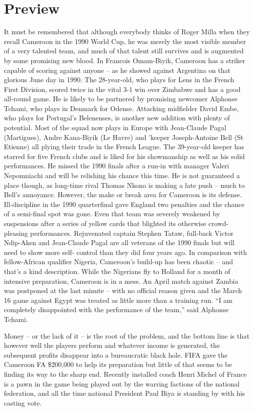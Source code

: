 \section{Preview}
It must be remembered that although everybody thinks of Roger Milla when they 
recall Cameroon in the 1990 World Cup, he was merely the most visible member of 
a very talented team, and much of that talent still survives and is augmented 
by some promising new blood.
In Francois Omam-Biyik, Cameroon has a striker capable of scoring against
anyone -- as he showed against Argentina on that glorious June day in 1990.
The 28-year-old, who plays for Lens in the French First Division, scored twice 
in the vital 3-1 win over Zimbabwe and has a good all-round game. He is likely 
to be partnered by promising newcomer Alphonse Tchami, who plays in Denmark for
Odense. Attacking midfielder David Embe, who plays for Portugal's Belenenses, 
is another new addition with plenty of potential. Most of the squad now plays 
in Europe with Jean-Claude Pagal (Martigues), Andre Kana-Biyik (Le Havre) and 
'keeper Joseph-Antoine Bell (St Etienne) all plying their trade in the French 
League. The 39-year-old keeper has starred for five French clubs and is liked 
for his showmanship as well as his solid performances. He missed the 1990 
finals after a run-in with manager Valeri Nepomniachi and will be relishing 
his chance this time. He is not guaranteed a place though, as long-time rival 
Thomas Nkono is making a late push -- much to Bell's annoyance. However, the
make or break area for Cameroon is its defense. Ill-discipline in the 1990 
quarterfinal gave England two penalties and the chance of a semi-final spot was
gone. Even that team was severely weakened by suspensions after a series of 
yellow cards that blighted its otherwise crowd-pleasing performances.
Rejuvenated captain Stephen Tataw, full-back Victor Ndip-Aken and Jean-Claude
Pagal are all veterans of the 1990 finals but will need to show more self-
control than they did four years ago. In comparison with fellow-African 
qualifier Nigeria, Cameroon's build-up has been chaotic -- and that's a kind 
description. While the Nigerians fly to Holland for a month of intensive 
preparation, Cameroon is in a mess. An April match against Zambia was postponed 
at the last minute -- with no official reason given and the March 16 game 
against Egypt was treated as little more than a training run. ``I am completely 
disappointed with the performance of the team,'' said Alphonse Tchami.

Money -- or the lack of it -- is the root of the problem, and the bottom line
is that however well the players perform and whatever income is generated, the
subsequent profits disappear into a bureaucratic black hole. FIFA gave the 
Cameroon FA \$200,000 to help its preparation but little of that seems to be 
finding its way to the sharp end. Recently installed coach Henri Michel of 
France is a pawn in the game being played out by the warring factions of the 
national federation, and all the time national President Paul Biya is standing 
by with his casting vote.


